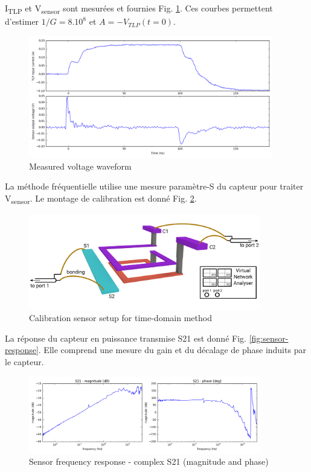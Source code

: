 I\textsubscript{TLP} et V\textsubscript{sensor} sont mesurées et fournies Fig. \ref{fig:measurement-nfs}.
Ces courbes permettent d'estimer $1/G = 8.10^8$ et $A = -V_{TLP}(t = 0)$.

\begin{figure}[!h]
  \centering
  \includegraphics[width=0.95\textwidth]{src/1/figures/measured_waveform.png}
  \caption{Measured voltage waveform}
  \label{fig:measurement-nfs}
\end{figure}

La méthode fréquentielle utilise une mesure paramètre-S du capteur pour traiter V\textsubscript{sensor}.
Le montage de calibration est donné Fig. \ref{fig:calibration-sensor-rf}.

\begin{figure}[!h]
  \centering
  \includegraphics[width=0.9\textwidth]{src/1/figures/sensor_measurement_setup_rf.pdf}
  \caption{Calibration sensor setup for time-domain method}
  \label{fig:calibration-sensor-rf}
\end{figure}

La réponse du capteur en puissance transmise S21 est donné Fig. \ref{fig:sensor-response}.
Elle comprend une mesure du gain et du décalage de phase induits par le capteur.

\begin{figure}[!h]
  \centering
  \includegraphics[width=0.9\textwidth]{src/1/figures/s21_freq_response.png}
  \caption{Sensor frequency response - complex S21 (magnitude and phase)}
  \label{fig:s21-response-complex}
\end{figure}

